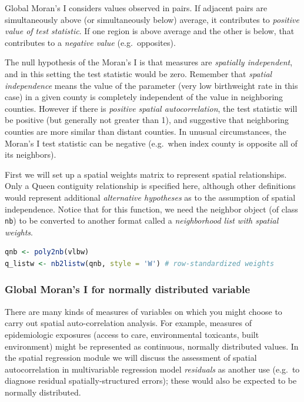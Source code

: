 \documentclass[
]{book}
\newcommand{\passthrough}[1]{#1}
\begin{document}
Global Moran's I considers values observed in pairs. If adjacent pairs are simultaneously above (or simultaneously below) average, it contributes to \emph{positive value of test statistic}. If one region is above average and the other is below, that contributes to a \emph{negative value} (e.g.~opposites).

The null hypothesis of the Moran's I is that measures are \emph{spatially independent}, and in this setting the test statistic would be zero. Remember that \emph{spatial independence} means the value of the parameter (very low birthweight rate in this case) in a given county is completely independent of the value in neighboring counties. However if there is \emph{positive spatial autocorrelation}, the test statistic will be positive (but generally not greater than 1), and suggestive that neighboring counties are more similar than distant counties. In unusual circumstances, the Moran's I test statistic can be negative (e.g.~when index county is opposite all of its neighbors).

First we will set up a spatial weights matrix to represent spatial relationships. Only a Queen contiguity relationship is specified here, although other definitions would represent additional \emph{alternative hypotheses} as to the assumption of spatial independence. Notice that for this function, we need the neighbor object (of class \passthrough{\lstinline!nb!}) to be converted to another format called a \emph{neighborhood list with spatial weights}.

\begin{lstlisting}[language=R]
qnb <- poly2nb(vlbw)
q_listw <- nb2listw(qnb, style = 'W') # row-standardized weights
\end{lstlisting}

\hypertarget{global-morans-i-for-normally-distributed-variable}{%
\subsubsection{Global Moran's I for normally distributed variable}\label{global-morans-i-for-normally-distributed-variable}}

There are many kinds of measures of variables on which you might choose to carry out spatial auto-correlation analysis. For example, measures of epidemiologic exposures (access to care, environmental toxicants, built environment) might be represented as continuous, normally distributed values. In the spatial regression module we will discuss the assessment of spatial autocorrelation in multivariable regression model \emph{residuals} as another use (e.g.~to diagnose residual spatially-structured errors); these would also be expected to be normally distributed.
\end{document}

